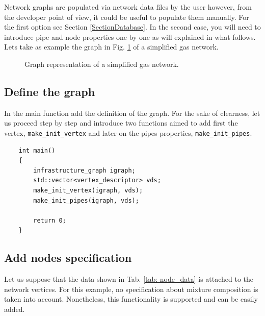     

Network graphs are populated via network data files by the user however, from the developer point of view, it could be useful to populate them manually. For the first option see Section \ref{SectionDatabase}. In the second case, you will need to introduce pipe and node properties one by one as will explained in what follows. Lets take as example the graph in Fig. \ref{fig: graph_example} of a simplified  gas network. 

\begin{figure}[H]
    \centering
                
    \caption{Graph representation of a simplified gas network.}
    \label{fig: graph_example}
\end{figure}

\subsection{Define the graph}
In the main function add the definition of the graph. For the sake of clearness, let us proceed step by step and introduce two functions aimed to add first the vertex, \texttt{make\_init\_vertex} and later on the pipes properties, \texttt{make\_init\_pipes}. 

\begin{verbatim}
    int main()
    {
        infrastructure_graph igraph;
        std::vector<vertex_descriptor> vds;
        make_init_vertex(igraph, vds);
        make_init_pipes(igraph, vds);
    
        return 0; 
    }
\end{verbatim}   


\subsection{Add nodes specification}
Let us suppose that the data shown in Tab. \ref{tab: node_data} is attached to the network vertices. For this example, no specification about mixture composition is  taken into account. Nonetheless, this functionality is supported and can be easily added.

